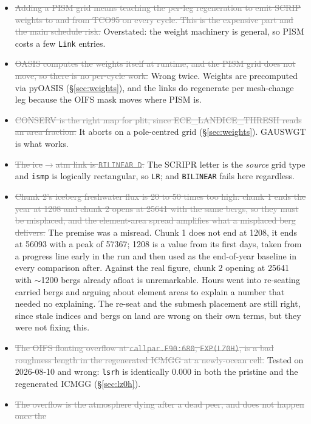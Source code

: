 \documentclass[11pt,a4paper]{article}
\newcommand{\code}[1]{\texttt{\small #1}}
\newcommand{\dead}[1]{\textcolor{gray}{\sout{#1}}}
\begin{document}
\label{sec:falsified}

\begin{itemize}
\item \dead{Adding a PISM grid means teaching the per-leg regeneration to emit SCRIP weights to
      and from TCO95 on every cycle. This is the expensive part and the main schedule risk.}
      Overstated: the weight machinery is general, so PISM costs a few \code{Link} entries.
\item \dead{OASIS computes the weights itself at runtime, and the PISM grid does not move, so
      there is no per-cycle work.} Wrong twice. Weights are precomputed via pyOASIS
      (\S\ref{sec:weights}), and the links do regenerate per mesh-change leg because the OIFS mask
      moves where PISM is.
\item \dead{CONSERV is the right map for plit, since ECE\_LANDICE\_THRESH reads an area fraction.}
      It aborts on a pole-centred grid (\S\ref{sec:weights}). GAUSWGT is what works.
\item \dead{The ice$\to$atm link is \code{BILINEAR D}.} The SCRIPR letter is the \emph{source}
      grid type and \code{ismp} is logically rectangular, so \code{LR}; and \code{BILINEAR} fails
      here regardless.
\item \dead{Chunk 2's iceberg freshwater flux is 20 to 50 times too high: chunk 1 ends the year at
      1208 and chunk 2 opens at 25641 with the same bergs, so they must be misplaced, and the
      element-area spread amplifies what a misplaced berg delivers.} The premise was a misread.
      Chunk 1 does not end at 1208, it ends at 56093 with a peak of 57367; 1208 is a value from its
      first days, taken from a progress line early in the run and then used as the end-of-year
      baseline in every comparison after. Against the real figure, chunk 2 opening at 25641 with
      $\sim$1200 bergs already afloat is unremarkable. Hours went into re-seating carried bergs and
      arguing about element areas to explain a number that needed no explaining. The re-seat and
      the submesh placement are still right, since stale indices and bergs on land are wrong on
      their own terms, but they were not fixing this.
\item \dead{The OIFS floating overflow at \code{callpar.F90:680}, \code{EXP(LZ0H)}, is a bad
      roughness length in the regenerated ICMGG at a newly-ocean cell.} Tested on 2026-08-10 and
      wrong: \code{lsrh} is identically 0.000 in both the pristine and the regenerated ICMGG
      (\S\ref{sec:lz0h}).
\item \dead{The overflow is the atmosphere dying after a dead peer, and does not happen once the
}
\end{itemize}
\end{document}
